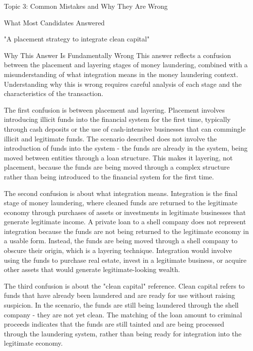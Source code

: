 \documentclass[8pt]{beamer}  %
\newcommand{\wrong}{\textcolor{errorred}{\ding{55}}}
\begin{document}
	\begin{frame}{Topic 3: Common Mistakes and Why They Are Wrong}
		\begin{block}{\large \wrong \textcolor{errorred}{What Most Candidates Answered}}
			\begin{center}
				\Large "A placement strategy to integrate clean capital"
			\end{center}
		\end{block}
		
		\vspace{0.2cm}
		\begin{block}{\large Why This Answer Is Fundamentally Wrong}
			This answer reflects a confusion between the placement and layering stages of money laundering, combined with a misunderstanding of what integration means in the money laundering context. Understanding why this is wrong requires careful analysis of each stage and the characteristics of the transaction.
			
			The first confusion is between placement and layering. Placement involves introducing illicit funds into the financial system for the first time, typically through cash deposits or the use of cash-intensive businesses that can commingle illicit and legitimate funds. The scenario described does not involve the introduction of funds into the system - the funds are already in the system, being moved between entities through a loan structure. This makes it layering, not placement, because the funds are being moved through a complex structure rather than being introduced to the financial system for the first time.
			
			The second confusion is about what integration means. Integration is the final stage of money laundering, where cleaned funds are returned to the legitimate economy through purchases of assets or investments in legitimate businesses that generate legitimate income. A private loan to a shell company does not represent integration because the funds are not being returned to the legitimate economy in a usable form. Instead, the funds are being moved through a shell company to obscure their origin, which is a layering technique. Integration would involve using the funds to purchase real estate, invest in a legitimate business, or acquire other assets that would generate legitimate-looking wealth.
			
			The third confusion is about the "clean capital" reference. Clean capital refers to funds that have already been laundered and are ready for use without raising suspicion. In the scenario, the funds are still being laundered through the shell company - they are not yet clean. The matching of the loan amount to criminal proceeds indicates that the funds are still tainted and are being processed through the laundering system, rather than being ready for integration into the legitimate economy.
			

\end{block}
\end{frame}
\end{document}
